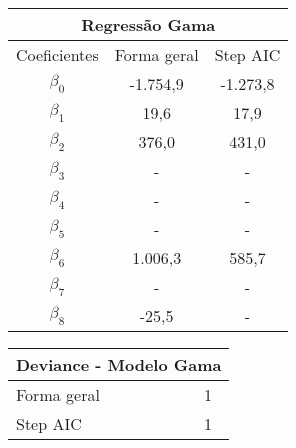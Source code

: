 \documentclass{article}
\begin{document}
\begin{table}[]
	\centering
	\begin{tabular}{ccc}
		\hline
		\multicolumn{3}{c}{\textbf{Regressão Gama}}               \\ \hline
		\multicolumn{1}{l}{Coeficientes} & Forma geral & Step AIC \\ \hline
		$\beta_0$                        & -1.754,9    & -1.273,8 \\
		$\beta_1$                        & 19,6        & 17,9     \\
		$\beta_2$                        & 376,0       & 431,0    \\
		$\beta_3$                        & -           & -        \\
		$\beta_4$                        & -           & -        \\
		$\beta_5$                        & -           & -        \\
		$\beta_6$                        & 1.006,3     & 585,7    \\
		$\beta_7$                        & -           & -        \\
		$\beta_8$                        & -25,5       & -        \\ \hline
	\end{tabular}
	\label{tab:my-table}
\end{table}



\begin{table}[]
	\centering
	\begin{tabular}{lc}
		\hline
		\multicolumn{2}{c}{\textbf{Deviance - Modelo Gama}} \\ \hline
		Forma geral                   & 1                   \\
		Step AIC                      & 1                   \\ \hline
	\end{tabular}
	\label{tab:my-table}
\end{table}
\end{document}
